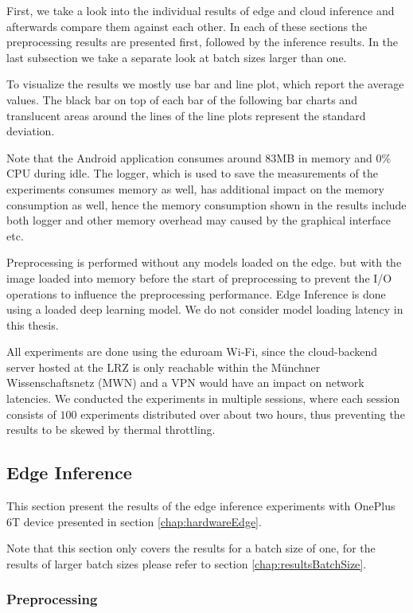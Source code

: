 First, we take a look into the individual results of edge and cloud inference and afterwards compare them against each other. In each of these sections the preprocessing results are presented first, followed by the inference results.
In the last subsection we take a separate look at batch sizes larger than one.

To visualize the results we mostly use bar and line plot, which report the average values.
The black bar on top of each bar of the following bar charts and translucent areas around the lines of the line plots represent the standard deviation.

Note that the Android application consumes around 83MB in memory and 0\% CPU during idle. The logger, which is used to save the measurements of the experiments consumes memory as well, has additional impact on the memory consumption as well, hence the memory consumption shown in the results include both logger and other memory overhead may caused by the graphical interface etc.

Preprocessing is performed without any models loaded on the edge. but with the image loaded into memory before the start of preprocessing to prevent the I/O operations to influence the preprocessing performance.
Edge Inference is done using a loaded deep learning model. 
We do not consider model loading latency in this thesis.

All experiments are done using the eduroam Wi‑Fi, since the cloud-backend server hosted at the LRZ is only reachable within the Münchner Wissenschaftsnetz (MWN) and a VPN would have an impact on network latencies.
We conducted the experiments in multiple sessions, where each session consists of $100$ experiments distributed over about two hours, thus preventing the results to be skewed by thermal throttling.
\subsection{Edge Inference}
This section present the results of the edge inference experiments with OnePlus 6T device presented in section \ref{chap:hardwareEdge}.

Note that this section only covers the results for a batch size of one, for the results of larger batch sizes please refer to section \ref{chap:resultsBatchSize}.

\FloatBarrier
\subsubsection{Preprocessing}
\label{chap:edgePrepro}

